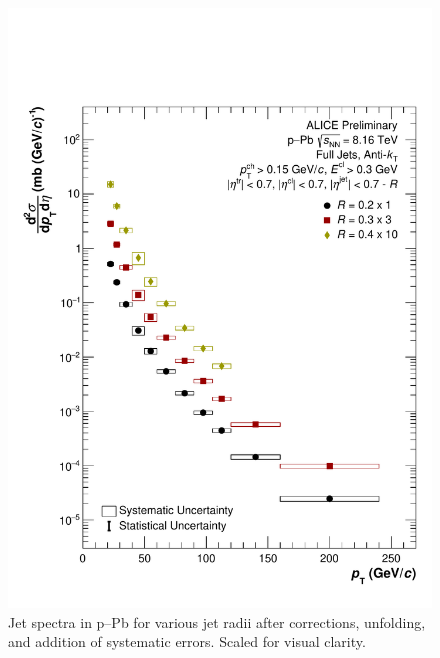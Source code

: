 \documentclass[ALICE]{ALICE_analysis_notes}
\newcommand{\pPb}{{\mbox{p--Pb}}\xspace}
\begin{document}
\begin{figure}
    \centering
    \includegraphics[width=15cm]{figures/pPbFigures/FinalResults/Bayes_reg6.pdf}
    \caption{Jet spectra in \pPb for various jet radii after corrections, unfolding, and addition of systematic errors. Scaled for visual clarity.}
    \label{fig:finalSpectrapPb}
\end{figure}
\end{document}
